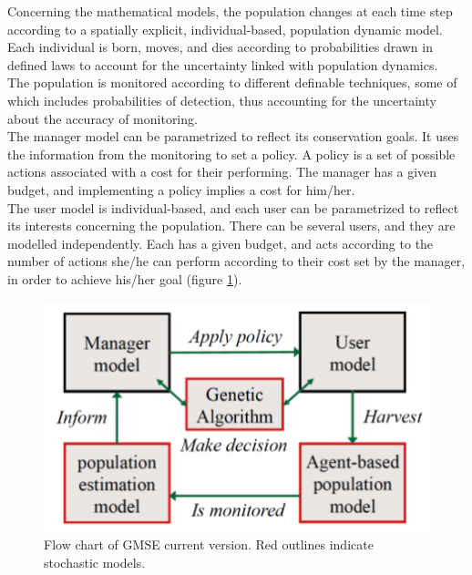 \documentclass[12pt,a4paper]{article}
\begin{document}
Concerning the mathematical models, the population changes at each time step according to a spatially explicit, individual-based, population dynamic model.
Each individual is born, moves, and dies according to probabilities drawn in defined laws to account for the uncertainty linked with population dynamics.\\
The population is monitored according to different definable techniques, some of which includes probabilities of detection, thus accounting for the uncertainty about the accuracy of monitoring.\\
The manager model can be parametrized to reflect its conservation goals.
It uses the information from the monitoring to set a policy.
A policy is a set of possible actions associated with a cost for their performing.
The manager has a given budget, and implementing a policy implies a cost for him/her.\\
The user model is individual-based, and each user can be parametrized to reflect its interests concerning the population.
There can be several users, and they are modelled independently.
Each has a given budget, and acts according to the number of actions she/he can perform according to their cost set by the manager, in order to achieve his/her goal (figure \ref{gmse-diagram}).\\
\begin{figure}
	\centering
	\includegraphics[scale=0.35]{gmse-diagram.png}
	\caption{Flow chart of GMSE current version. Red outlines indicate stochastic models.}
	\label{gmse-diagram}
\end{figure}
%
\end{document}
